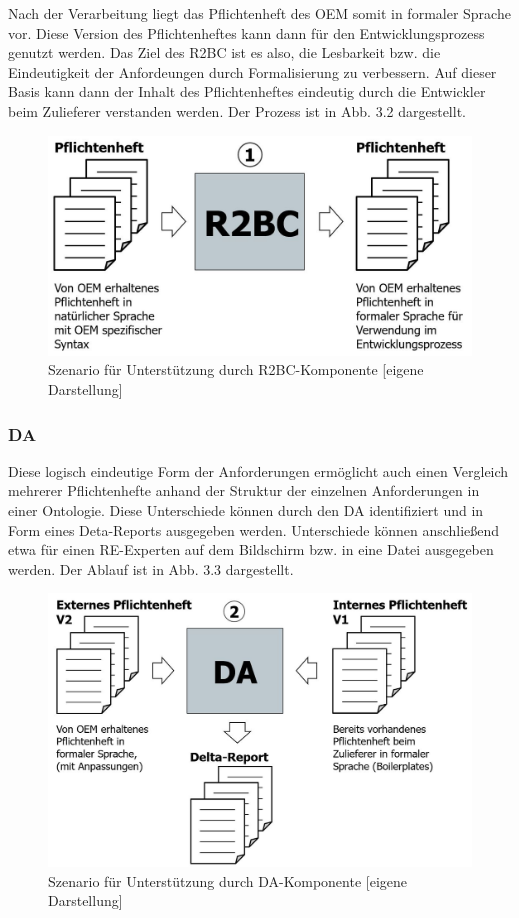 \documentclass[12pt]{report}
\begin{document}
Nach der Verarbeitung liegt das Pflichtenheft des OEM somit in formaler Sprache vor. Diese Version des Pflichtenheftes kann dann für den Entwicklungsprozess genutzt werden. Das Ziel des R2BC ist es also, die Lesbarkeit bzw. die Eindeutigkeit der Anfordeungen durch Formalisierung zu verbessern. Auf dieser Basis kann dann der Inhalt des Pflichtenheftes eindeutig durch die Entwickler beim Zulieferer verstanden werden. Der Prozess ist in Abb. 3.2 dargestellt.
\begin{figure}[h!]
\begin{center}
\includegraphics[scale=0.5]{Bilder/Prozess-R2BC.jpg}
\caption{Szenario für Unterstützung durch R2BC-Komponente [eigene Darstellung]}
\end{center}
\end{figure}

\subsubsection{DA}
Diese logisch eindeutige Form der Anforderungen ermöglicht auch einen Vergleich mehrerer Pflichtenhefte anhand der Struktur der einzelnen Anforderungen in einer Ontologie. Diese Unterschiede können durch den DA identifiziert und in Form eines Deta-Reports ausgegeben werden. Unterschiede können anschließend etwa für einen RE-Experten auf dem Bildschirm bzw. in eine Datei ausgegeben werden. Der Ablauf ist in Abb. 3.3 dargestellt.
\begin{figure}[h!]
\begin{center}
\includegraphics[scale=0.5]{Bilder/Prozess-DA.jpg}
\caption{Szenario für Unterstützung durch DA-Komponente [eigene Darstellung]}
\end{center}
\end{figure}
\end{document}
